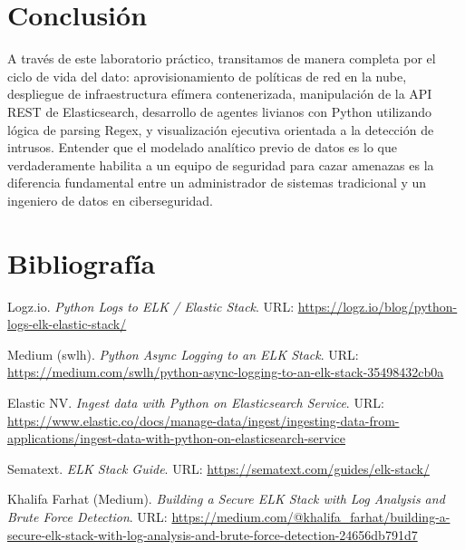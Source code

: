 \documentclass[
  coursetitle={Cómputo Nube y Tecnologías Emergentes},
  coursehours={96},
  coursedate={Verano 2026},
  doctype={Práctica},
  otherlangs={english,french},
  authorname={Lázaro},
  authorsurname={Bustio-Martínez},
  authortitle={PhD},
  role={Profesor Investigador},
  email={lbustio@inaoe.mx},
  phone={5559504000},
  ext={7459},
  institution={Instituto Nacional de Astrofísica, Óptica y Electrónica (INAOE)},
  department={Maestría en Ciencias en Tecnologías de Seguridad},
  address={Luis Enrique Erro 1, Sta. Ma. Tonantzintla, San Andrés Cholula, CP 72840, Puebla, México},
  margin={0.5in}
]{../../lbustio_lecture_notes}
\begin{document}
\section{Conclusión}
A través de este laboratorio práctico, transitamos de manera completa por el ciclo de vida del dato: aprovisionamiento de políticas de red en la nube, despliegue de infraestructura efímera contenerizada, manipulación de la API REST de Elasticsearch, desarrollo de agentes livianos con Python utilizando lógica de parsing Regex, y visualización ejecutiva orientada a la detección de intrusos. Entender que el modelado analítico previo de datos es lo que verdaderamente habilita a un equipo de seguridad para cazar amenazas es la diferencia fundamental entre un administrador de sistemas tradicional y un ingeniero de datos en ciberseguridad.

\section{Bibliografía}
\begin{thebibliography}{9}

Logz.io. \textit{Python Logs to ELK / Elastic Stack}. URL: \url{https://logz.io/blog/python-logs-elk-elastic-stack/}

Medium (swlh). \textit{Python Async Logging to an ELK Stack}. URL: \url{https://medium.com/swlh/python-async-logging-to-an-elk-stack-35498432cb0a}

Elastic NV. \textit{Ingest data with Python on Elasticsearch Service}. URL: \url{https://www.elastic.co/docs/manage-data/ingest/ingesting-data-from-applications/ingest-data-with-python-on-elasticsearch-service}

Sematext. \textit{ELK Stack Guide}. URL: \url{https://sematext.com/guides/elk-stack/}

Khalifa Farhat (Medium). \textit{Building a Secure ELK Stack with Log Analysis and Brute Force Detection}. URL: \url{https://medium.com/@khalifa_farhat/building-a-secure-elk-stack-with-log-analysis-and-brute-force-detection-24656db791d7}

\end{thebibliography}
\end{document}
